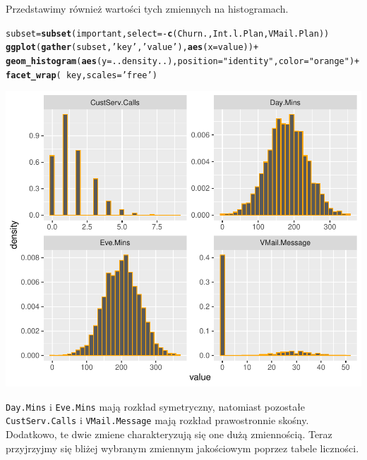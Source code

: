 \documentclass{article}\usepackage[]{graphicx}\usepackage[]{color}
\makeatletter
\def\maxwidth{ %
  \ifdim\Gin@nat@width>\linewidth
    \linewidth
  \else
    \Gin@nat@width
  \fi
}
\newcommand{\hlstr}[1]{\textcolor[rgb]{0.192,0.494,0.8}{#1}}%
\newcommand{\hlopt}[1]{\textcolor[rgb]{0,0,0}{#1}}%
\newcommand{\hlstd}[1]{\textcolor[rgb]{0.345,0.345,0.345}{#1}}%
\newcommand{\hlkwb}[1]{\textcolor[rgb]{0.69,0.353,0.396}{#1}}%
\newcommand{\hlkwc}[1]{\textcolor[rgb]{0.333,0.667,0.333}{#1}}%
\newcommand{\hlkwd}[1]{\textcolor[rgb]{0.737,0.353,0.396}{\textbf{#1}}}%
\newenvironment{kframe}{%
 \def\at@end@of@kframe{}%
 \ifinner\ifhmode%
  \def\at@end@of@kframe{\end{minipage}}%
  \begin{minipage}{\columnwidth}%
 \fi\fi%
 \def\FrameCommand##1{\hskip\@totalleftmargin \hskip-\fboxsep
 \colorbox{shadecolor}{##1}\hskip-\fboxsep
     \hskip-\linewidth \hskip-\@totalleftmargin \hskip\columnwidth}%
 \MakeFramed {\advance\hsize-\width
   \@totalleftmargin\z@ \linewidth\hsize
   \@setminipage}}%
 {\par\unskip\endMakeFramed%
 \at@end@of@kframe}
\newenvironment{knitrout}{}{} %
\makeatother
\begin{document}
Przedstawimy również wartości tych zmiennych na histogramach.

\begin{knitrout}
\color{fgcolor}\begin{kframe}
\begin{alltt}
\hlstd{subset} \hlkwb{=} \hlkwd{subset}\hlstd{(important,} \hlkwc{select}\hlstd{=}\hlopt{-}\hlkwd{c}\hlstd{(Churn., Int.l.Plan, VMail.Plan))}
\hlkwd{ggplot}\hlstd{(}\hlkwd{gather}\hlstd{(subset,} \hlstr{'key'}\hlstd{,} \hlstr{'value'}\hlstd{),} \hlkwd{aes}\hlstd{(}\hlkwc{x}\hlstd{=value))} \hlopt{+}
  \hlkwd{geom_histogram}\hlstd{(}\hlkwd{aes}\hlstd{(}\hlkwc{y}\hlstd{=..density..),} \hlkwc{position}\hlstd{=}\hlstr{"identity"}\hlstd{,} \hlkwc{color}\hlstd{=}\hlstr{"orange"}\hlstd{)} \hlopt{+}
  \hlkwd{facet_wrap}\hlstd{(}\hlopt{~}\hlstd{key,} \hlkwc{scales}\hlstd{=}\hlstr{'free'}\hlstd{)}
\end{alltt}
\end{kframe}

{\centering \includegraphics[width=\maxwidth]{figure/Histogramy-1} 

}



\end{knitrout}


\verb|Day.Mins| i \verb|Eve.Mins| mają rozkład symetryczny, natomiast pozostałe \verb|CustServ.Calls| i \verb|VMail.Message| mają rozkład prawostronnie skośny. Dodatkowo, te dwie zmiene charakteryzują się one dużą zmiennością.\newline
\vspace{1cm}
Teraz przyjrzyjmy się bliżej wybranym zmiennym jakościowym poprzez tabele liczności.
\end{document}
